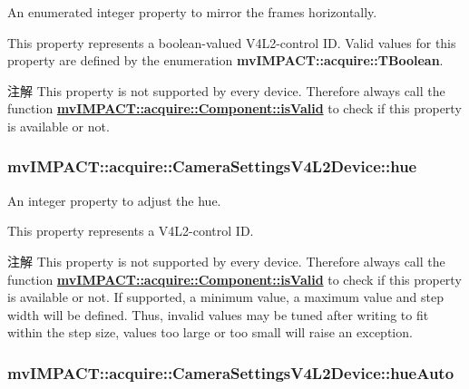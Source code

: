 An enumerated integer property to mirror the frames horizontally. 

This property represents a boolean-\/valued V4\+L2-\/control I\+D. Valid values for this property are defined by the enumeration {\bfseries mv\+I\+M\+P\+A\+C\+T\+::acquire\+::\+T\+Boolean}.

\begin{DoxyNote}{注解}
This property is not supported by every device. Therefore always call the function {\bfseries \hyperlink{classmv_i_m_p_a_c_t_1_1acquire_1_1_component_ac51e55e7e046101f3c6119d84123abd5}{mv\+I\+M\+P\+A\+C\+T\+::acquire\+::\+Component\+::is\+Valid}} to check if this property is available or not. 
\end{DoxyNote}
\hypertarget{classmv_i_m_p_a_c_t_1_1acquire_1_1_camera_settings_v4_l2_device_aecfc16d0f66ee27384d56c99316bd84e}{
\subsubsection[{hue}]{ mv\+I\+M\+P\+A\+C\+T\+::acquire\+::\+Camera\+Settings\+V4\+L2\+Device\+::hue}}\label{classmv_i_m_p_a_c_t_1_1acquire_1_1_camera_settings_v4_l2_device_aecfc16d0f66ee27384d56c99316bd84e}


An integer property to adjust the hue. 

This property represents a V4\+L2-\/control I\+D.

\begin{DoxyNote}{注解}
This property is not supported by every device. Therefore always call the function {\bfseries \hyperlink{classmv_i_m_p_a_c_t_1_1acquire_1_1_component_ac51e55e7e046101f3c6119d84123abd5}{mv\+I\+M\+P\+A\+C\+T\+::acquire\+::\+Component\+::is\+Valid}} to check if this property is available or not. If supported, a minimum value, a maximum value and step width will be defined. Thus, invalid values may be tuned after writing to fit within the step size, values too large or too small will raise an exception. 
\end{DoxyNote}
\hypertarget{classmv_i_m_p_a_c_t_1_1acquire_1_1_camera_settings_v4_l2_device_a39eef7f0246494e961bcb521f509a874}{
\subsubsection[{hue\+Auto}]{ mv\+I\+M\+P\+A\+C\+T\+::acquire\+::\+Camera\+Settings\+V4\+L2\+Device\+::hue\+Auto}}\label{classmv_i_m_p_a_c_t_1_1acquire_1_1_camera_settings_v4_l2_device_a39eef7f0246494e961bcb521f509a874}


